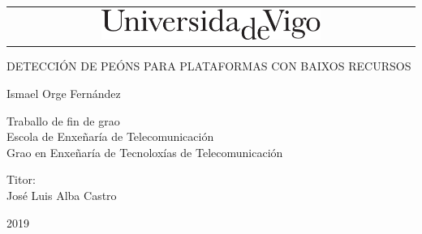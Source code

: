 \begin{titlepage}

\Large
\sffamily

\begin{center}
  \begin{tabular}{c}
    \includegraphics[width=0.55\textwidth]{./head/unilogo}
  \end{tabular}
\end{center}

\vfill
\begin{center}
  \huge DETECCIÓN DE PEÓNS PARA PLATAFORMAS CON BAIXOS RECURSOS
\vspace{26pt}\\
\textcolor{gray}{\small{}}
\end{center}

\vspace*{2cm}
\centerline{\huge 
Ismael Orge Fernández}

\vfill

\begin{center}
  \large
  Traballo de fin de grao \\
  Escola de Enxeñaría de Telecomunicación \\
 Grao en   Enxeñaría de Tecnoloxías de Telecomunicación
\end{center}

\vfill
\begin{center}
  Titor: \\
  José Luis Alba Castro\\
\end{center}
\vfill
\centerline{2019}
\end{titlepage}
\pagebreak
\pagebreak
\thispagestyle{empty}
\vspace*{12cm}



\begin{flushright}



\end{flushright}


